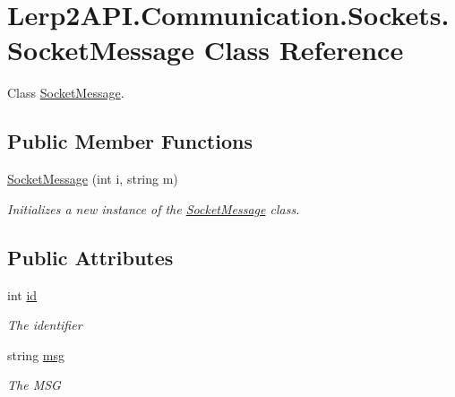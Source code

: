 \hypertarget{class_lerp2_a_p_i_1_1_communication_1_1_sockets_1_1_socket_message}{}\section{Lerp2\+A\+P\+I.\+Communication.\+Sockets.\+Socket\+Message Class Reference}
\label{class_lerp2_a_p_i_1_1_communication_1_1_sockets_1_1_socket_message}


Class \hyperlink{class_lerp2_a_p_i_1_1_communication_1_1_sockets_1_1_socket_message}{Socket\+Message}.  


\subsection*{Public Member Functions}
\begin{DoxyCompactItemize}
\item 
\hyperlink{class_lerp2_a_p_i_1_1_communication_1_1_sockets_1_1_socket_message_a7a00c74845f8a7414683705f9320e693}{Socket\+Message} (int i, string m)
\begin{DoxyCompactList}\small\item\em Initializes a new instance of the \hyperlink{class_lerp2_a_p_i_1_1_communication_1_1_sockets_1_1_socket_message}{Socket\+Message} class. \end{DoxyCompactList}\end{DoxyCompactItemize}
\subsection*{Public Attributes}
\begin{DoxyCompactItemize}
\item 
int \hyperlink{class_lerp2_a_p_i_1_1_communication_1_1_sockets_1_1_socket_message_ad2ae1ca22e7122f381d8cdf18e1609c9}{id}
\begin{DoxyCompactList}\small\item\em The identifier \end{DoxyCompactList}\item 
string \hyperlink{class_lerp2_a_p_i_1_1_communication_1_1_sockets_1_1_socket_message_a5709cbeaa3cbb5e6e752d240b8f73f9b}{msg}
\begin{DoxyCompactList}\small\item\em The M\+SG \end{DoxyCompactList}\end{DoxyCompactItemize}


